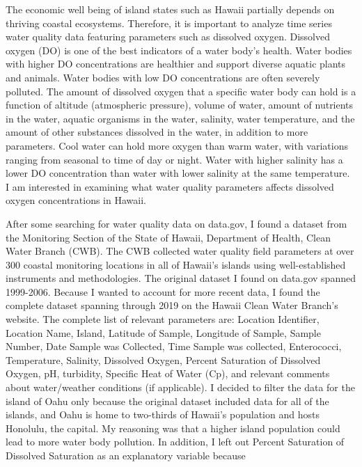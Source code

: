 \documentclass[12pt,]{article}
\begin{document}
The economic well being of island states such as Hawaii partially
depends on thriving coastal ecosystems. Therefore, it is important to
analyze time series water quality data featuring parameters such as
dissolved oxygen. Dissolved oxygen (DO) is one of the best indicators of
a water body's health. Water bodies with higher DO concentrations are
healthier and support diverse aquatic plants and animals. Water bodies
with low DO concentrations are often severely polluted. The amount of
dissolved oxygen that a specific water body can hold is a function of
altitude (atmospheric pressure), volume of water, amount of nutrients in
the water, aquatic organisms in the water, salinity, water temperature,
and the amount of other substances dissolved in the water, in addition
to more parameters. Cool water can hold more oxygen than warm water,
with variations ranging from seasonal to time of day or night. Water
with higher salinity has a lower DO concentration than water with lower
salinity at the same temperature. I am interested in examining what
water quality parameters affects dissolved oxygen concentrations in
Hawaii.

After some searching for water quality data on data.gov, I found a
dataset from the Monitoring Section of the State of Hawaii, Department
of Health, Clean Water Branch (CWB). The CWB collected water quality
field parameters at over 300 coastal monitoring locations in all of
Hawaii's islands using well-established instruments and methodologies.
The original dataset I found on data.gov spanned 1999-2006. Because I
wanted to account for more recent data, I found the complete dataset
spanning through 2019 on the Hawaii Clean Water Branch's website. The
complete list of relevant parameters are: Location Identifier, Location
Name, Island, Latitude of Sample, Longitude of Sample, Sample Number,
Date Sample was Collected, Time Sample was collected, Enterococci,
Temperature, Salinity, Dissolved Oxygen, Percent Saturation of Dissolved
Oxygen, pH, turbidity, Specific Heat of Water (Cp), and relevant
comments about water/weather conditions (if applicable). I decided to
filter the data for the island of Oahu only because the original dataset
included data for all of the islands, and Oahu is home to two-thirds of
Hawaii's population and hosts Honolulu, the capital. My reasoning was
that a higher island population could lead to more water body pollution.
In addition, I left out Percent Saturation of Dissolved Saturation as an
explanatory variable because
\end{document}
